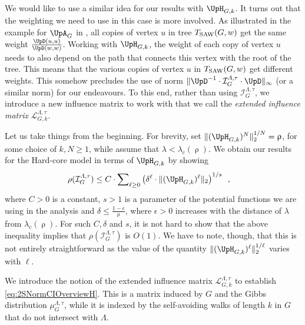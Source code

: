 \documentclass[11pt,reqno]{amsart}
\numberwithin{equation}{section}
\newcommand{\cI}{{\mathcal{I}}}
\newcommand{\cL}{{\mathcal{L}}}
\newcommand{\applegreen}[1]{ {\color{applegreen}#1}}
\newcommand{\blue}[1]{{\color{blue}#1}}
\newcommand{\bluepigment}[1]{{\color{blue(pigment)}#1}}
\newcommand{\cadmiumgreen}[1]{{\color{cadmiumgreen}#1}}
\newcommand{\darkmagenta}[1]{{\color{darkmagenta}#1}}
\newcommand{\goldenbrown}[1]{{\color{goldenbrown}#1}}
\newcommand{\red}[1]{{\color{red}#1}}
\newcommand{\lcritical}{{\lambda_c}}
\newcommand{\pfs}{\darkmagenta{s}}
\newcommand{\Tsaw}{T_{\rm SAW}}
\newcommand{\infmatrix}{\cI}
\newcommand{\spradius}{{\rho}}
\newcommand{\norm}[2]{\goldenbrown{\|} #1 \goldenbrown{\|}_{#2}}
\newcommand{\nnorm}[3]{\goldenbrown{\|} #1\goldenbrown{\|}^{#2}_{#3}}
\newcommand{\Adjacency}{{\UpA}}
\newcommand{\NBMatrix}{\cadmiumgreen{\UpH}_{G,\kk}}
\renewcommand{\applegreen}[1]{#1}
\renewcommand{\blue}[1]{#1}
\renewcommand{\bluepigment}[1]{#1}
\renewcommand{\cadmiumgreen}[1]{#1}
\renewcommand{\darkmagenta}[1]{#1}
\renewcommand{\goldenbrown}[1]{#1}
\renewcommand{\red}[1]{#1}
\newcommand{\kk}{\bluepigment{k}}
\newcommand{\kell}{{\color{green(pigment)}\ell}}%
\newcommand{\ku}{\red{u}}
\newcommand{\kw}{\blue{w}}
\renewcommand{\kk}{k}
\renewcommand{\kell}{\ell}
\renewcommand{\ku}{u}
\renewcommand{\kw}{w}
\newcommand{\ExtdInfMatrixF}{\applegreen{\cL}^{\Lambda,\tau}_{G,\kk}}
\newcommand{\SingBound}{\uprho}
\begin{document}
We would like to use a similar idea  for our results with $\NBMatrix$. It turns out that the weighting we
need to use in this case is more involved. As illustrated in  the example for $\Adjacency_G$  in
,  all copies of vertex $\ku$ in tree $\Tsaw(G,\kw)$ get the same weight
$\frac{\UpD(\ku,\ku)}{\UpD(\kw,\kw)}$.  Working with $\NBMatrix$,  the weight of each copy of vertex
$\ku$ needs to  also depend on the path that connects this vertex   with the root of the tree. This means
that the various copies of  vertex $\ku$ in $\Tsaw(G,\kw)$ get different weights. This somehow precludes 
the use of norm $\norm{ \UpD^{-1} \cdot \infmatrix^{\Lambda,\tau}_{G} \cdot \UpD }{\infty}$ (or a similar norm) for our
endeavours. 
To this end, rather than using $\infmatrix^{\Lambda,\tau}_{G}$, we introduce a new influence matrix to work with that
we call the {\em extended  influence matrix}  $\ExtdInfMatrixF$. 


Let us take things from the beginning. 
For brevity, set  $\nnorm{(\NBMatrix)^N}{1/N}{2}=\SingBound$, for some choice 
of $\kk,N\geq 1$, while assume  that  $\lambda<\lcritical(\SingBound)$. 
We obtain our results for the Hard-core model  in terms of $\NBMatrix$
by showing 
%
\begin{align}\label{eq:2SNormCIOverviewH}
\spradius( \infmatrix^{\Lambda,\tau}_{G} ) & \leq C\cdot \sum\nolimits_{\kell\geq 0} \left( \delta^{\kell}
\cdot \norm{( \NBMatrix)^{\kell}}{2} \right)^{1/\pfs}\enspace,
\end{align}
where  $C>0$ is a constant,  $\pfs> 1$ is a parameter of the potential functions we are using  in the analysis 
and  $\delta\leq \frac{1-\epsilon}{\SingBound}$,  where $\epsilon>0$ increases with the  distance of 
$\lambda$ from $\lcritical(\SingBound)$. 
%
For such $C,\delta$ and $\pfs$,  it is not hard to show that the above inequality implies
that $\spradius( \infmatrix^{\Lambda,\tau}_{G})$ is $O(1)$. We have to note, though, that this is not 
entirely straightforward as  the value of  the quantity $\nnorm{( \NBMatrix)^{\kell}}{1/\kell}{2}$  varies with $\kell$.





We introduce the notion of  the extended  influence matrix $\ExtdInfMatrixF$ to establish \eqref{eq:2SNormCIOverviewH}.  
This  is a matrix induced by $G$ and the Gibbs distribution $\mu^{\Lambda,\tau}_G$, while it 
is indexed by the self-avoiding walks of length $\kk$ in $G$ that  do not  intersect with $\Lambda$.   
\end{document}
